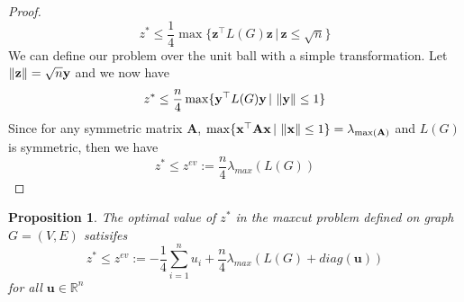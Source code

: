 \documentclass[12pt]{article}
\theoremstyle{plain}
\newtheorem{prop}{Proposition}
\theoremstyle{definition}
\begin{document}
\begin{proof}
\begin{equation}
z^* \leq \frac{1}{4} \max \lbrace \mathbf{z}^\top L(G) \mathbf{z} \,|\, \mathbf{z} \leq \sqrt{n} \rbrace
\end{equation}    
We can define our problem over the unit ball with a simple transformation. Let $\left\lVert\mathbf{z}\right\rVert = \sqrt{n} \mathbf{y}$ and
we now have
\begin{equation}
    z^* \leq \frac{n}{4} \max \lbrace \mathbf{y}^\top L(G) \mathbf{y} \,|\, \left\lVert\mathbf{y}\right\rVert \leq 1 \rbrace
\end{equation}  
Since for any symmetric matrix $\mathbf{A}$, $\max\lbrace \mathbf{x}^\top \mathbf{A} \mathbf{x}\,|\, \left\lVert\mathbf{x}\right\rVert \leq 1 \rbrace = \lambda_{\max(\mathbf{A})}$ 
and $L(G)$ is symmetric, then we have 
\begin{equation}
z^* \leq z^{ev} := \dfrac{n}{4} \lambda_{max}(L(G))
\end{equation}

\end{proof}


\begin{prop}
    The optimal value of $z^*$ in the maxcut problem defined on graph $G=(V,E)$ satisifes
    \[
        z^* \leq z^{ev} := - \frac{1}{4}\sum_{i=1}^n u_i + \dfrac{n}{4} \lambda_{max}(L(G) + diag(\mathbf{u}))
    \]
    for all $\mathbf{u} \in \mathbb{R}^n$
\end{prop}
\end{document}
